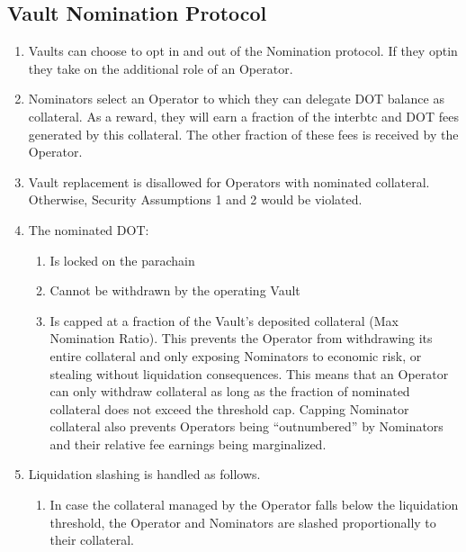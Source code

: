 \documentclass[a4paper,10pt,english]{sphinxmanual}
\begin{document}
\subsection{Vault Nomination Protocol}
\label{\detokenize{spec/nomination:vault-nomination-protocol}}\begin{enumerate}
%
\item {} 
Vaults can choose to opt in and out of the Nomination protocol. If they opt\sphinxhyphen{}in they take on the additional role of an Operator.

\item {} 
Nominators select an Operator to which they can delegate DOT balance as collateral. As a reward, they will earn a fraction of the interbtc and DOT fees generated by this collateral. The other fraction of these fees is received by the Operator.

\item {} 
Vault replacement is disallowed for Operators with nominated collateral. Otherwise, Security Assumptions 1 and 2 would be violated.

\item {} 
The nominated DOT:
\begin{enumerate}
%
\item {} 
Is locked on the parachain

\item {} 
Cannot be withdrawn by the operating Vault

\item {} 
Is capped at a fraction of the Vault’s deposited collateral (Max Nomination Ratio). This prevents the Operator from withdrawing its entire collateral and only exposing Nominators to economic risk, or stealing without liquidation consequences. This means that an Operator can only withdraw collateral as long as the fraction of nominated collateral does not exceed the threshold cap. Capping Nominator collateral also prevents Operators being “outnumbered” by Nominators and their relative fee earnings being marginalized.

\end{enumerate}

\item {} 
Liquidation slashing is handled as follows.
\begin{enumerate}
%
\item {} 
In case the collateral managed by the Operator falls below the liquidation threshold, the Operator and Nominators are slashed proportionally to their collateral.


\end{enumerate}
\end{enumerate}
\end{document}
